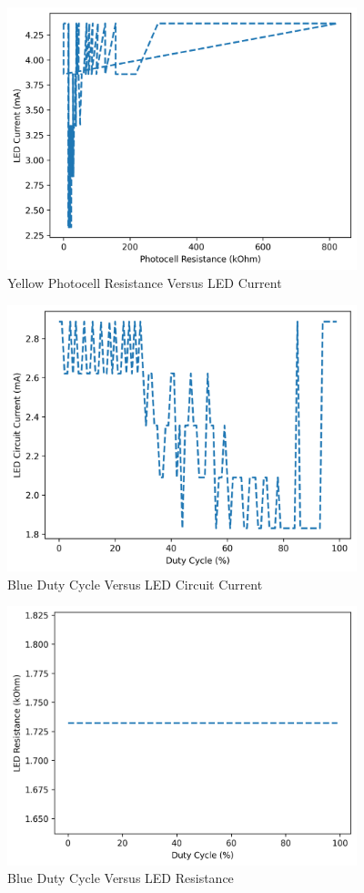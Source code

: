 \documentclass[12pt,titlepage]{article}
\begin{document}
\begin{figure}[!htb]
  \centering
  \includegraphics[width=4in]{lab_4/yellow_photo_res_led_curr.png}
  \caption{Yellow Photocell Resistance Versus LED Current}
\end{figure}
\begin{figure}[!htb]
  \centering
  \includegraphics[width=4in]{lab_4/blue_duty_cycle_led_circuit_curr.png}
  \caption{Blue Duty Cycle Versus LED Circuit Current}
\end{figure}
\begin{figure}[!htb]
  \centering
  \includegraphics[width=4in]{lab_4/blue_duty_cycle_led_res.png}
  \caption{Blue Duty Cycle Versus LED Resistance}
\end{figure}
\end{document}
